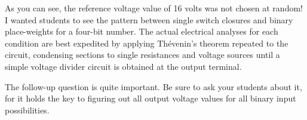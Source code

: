 





As you can see, the reference voltage value of 16 volts was not chosen at random!  I wanted students to see the pattern between single switch closures and binary place-weights for a four-bit number.  The actual electrical analyses for each condition are best expedited by applying Th\'evenin's theorem repeated to the circuit, condensing sections to single resistances and voltage sources until a simple voltage divider circuit is obtained at the output terminal.

The follow-up question is quite important.  Be sure to ask your students about it, for it holds the key to figuring out all output voltage values for all binary input possibilities.




